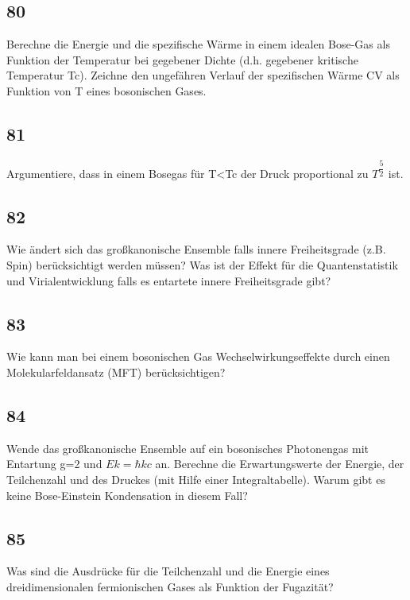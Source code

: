 \documentclass[12pt,a4paper]{report}
\newenvironment{myfrag}{\begin{it}}{\end{it}\vspace{3mm}\par}
\numberwithin{equation}{section}
\begin{document}
\subsection{80}
\begin{myfrag}
Berechne die Energie und die spezifische Wärme in einem idealen Bose-Gas
als Funktion der Temperatur bei gegebener Dichte (d.h. gegebener kritische
Temperatur Tc). Zeichne den ungefähren Verlauf der spezifischen Wärme CV
als Funktion von T eines bosonischen Gases.
\end{myfrag}
\subsection{81}
\begin{myfrag}
Argumentiere, dass in einem Bosegas für T<Tc der Druck proportional zu $T^{\dfrac{5}{2}}$
ist.
\end{myfrag}
\subsection{82}
\begin{myfrag}
Wie ändert sich das großkanonische Ensemble falls innere Freiheitsgrade
(z.B. Spin) berücksichtigt werden müssen? Was ist der Effekt für die
Quantenstatistik und Virialentwicklung falls es entartete innere Freiheitsgrade
gibt?
\end{myfrag}
\subsection{83}
\begin{myfrag}
Wie kann man bei einem bosonischen Gas Wechselwirkungseffekte durch
einen Molekularfeldansatz (MFT) berücksichtigen?
\end{myfrag}
\subsection{84}
\begin{myfrag}
Wende das großkanonische Ensemble auf ein bosonisches Photonengas mit
Entartung g=2 und $Ek=\hbar kc$ an. Berechne die Erwartungswerte der Energie,
der Teilchenzahl und des Druckes (mit Hilfe einer Integraltabelle). Warum
gibt es keine Bose-Einstein Kondensation in diesem Fall?
\end{myfrag}
\subsection{85}
\begin{myfrag}
Was sind die Ausdrücke für die Teilchenzahl und die Energie eines
dreidimensionalen fermionischen Gases als Funktion der Fugazität?
\end{myfrag}
\end{document}
